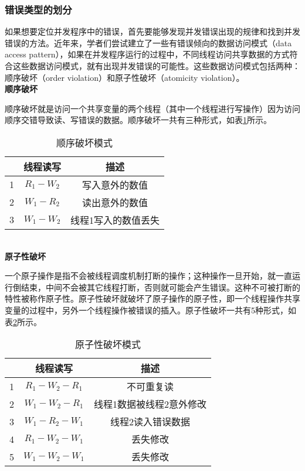 \subsubsection{错误类型的划分}
如果想要定位并发程序中的错误，首先要能够发现并发错误出现的规律和找到并发错误的方法。近年来，学者们尝试建立了一些有错误倾向的数据访问模式（data access pattern），如果在并发程序运行的过程中，不同线程访问共享数据的方式符合这些数据访问模式，就有出现并发错误的可能性。这些数据访问模式包括两种：顺序破坏（order violation）和原子性破坏（atomicity violation）。\\
\textbf{顺序破坏}\par
顺序破坏就是访问一个共享变量的两个线程（其中一个线程进行写操作）因为访问顺序交错导致读、写错误的数据。顺序破坏一共有三种形式，如表\ref{tab:ConflictingInterleavingPatterns}所示。
  \begin{table}[!ht]
    \centering
    \caption{顺序破坏模式}\label{tab:ConflictingInterleavingPatterns}
    \begin{tabular}{|c|c|c|}
      \hline
        & 线程读写 & 描述 \\\hline
      1 & $R_1-W_2$ & 写入意外的数值 \\\hline
      2 & $W_1-R_2$ & 读出意外的数值 \\\hline
      3 & $W_1-W_2$ & 线程1写入的数值丢失 \\
      \hline
    \end{tabular}
  \end{table}\\
\textbf{原子性破坏}\par
一个原子操作是指不会被线程调度机制打断的操作；这种操作一旦开始，就一直运行倒结束，中间不会被其它线程打断，否则就可能会产生错误。这种不可被打断的特性被称作原子性。原子性破坏就破坏了原子操作的原子性，即一个线程操作共享变量的过程中，另外一个线程操作被错误的插入。原子性破坏一共有5种形式，如表\ref{tab:UnSeInterleavingPatterns}所示。
 \begin{table}[!ht]
    \centering
    \caption{原子性破坏模式}\label{tab:UnSeInterleavingPatterns}
    \begin{tabular}{|c|c|c|}
      \hline
        & 线程读写 & 描述 \\\hline
      1 & $R_1-W_2-R_1$ & 不可重复读 \\\hline
      2 & $W_1-W_2-R_1$ & 线程1数据被线程2意外修改 \\\hline
      3 & $W_1-R_2-W_1$ & 线程2读入错误数据 \\\hline
      4 & $R_1-W_2-W_1$ & 丢失修改 \\\hline
      5 & $W_1-W_2-W_1$ & 丢失修改 \\
      \hline
    \end{tabular}
  \end{table}
